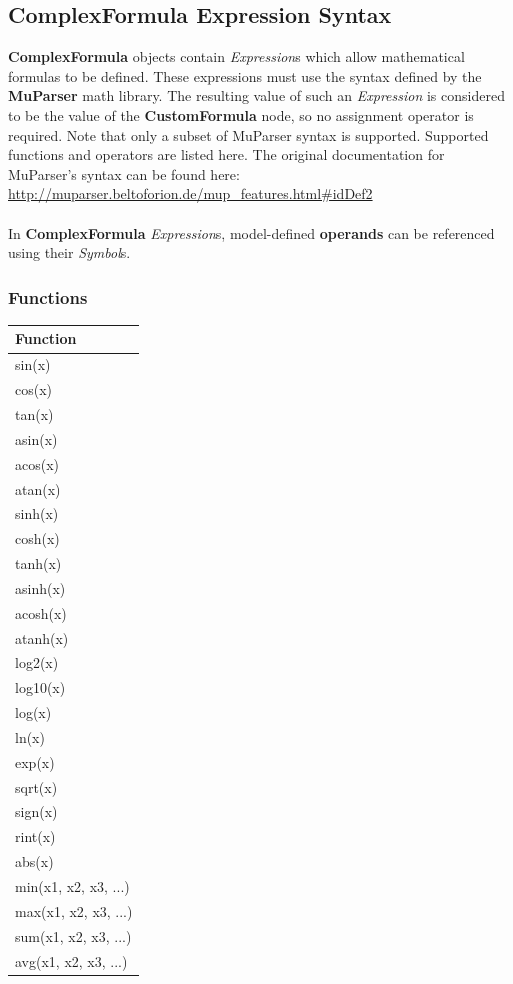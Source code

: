 \subsection{ComplexFormula Expression Syntax}
\label{subsec:ComplexFormulaExpressionSyntax}
\textbf{ComplexFormula} objects contain \textit{Expression}s which allow mathematical formulas to be defined. These expressions must use the syntax defined by the \textbf{MuParser} math library. The resulting value of such an \textit{Expression} is considered to be the value of the \textbf{CustomFormula} node, so no assignment operator is required. Note that only a subset of MuParser syntax is supported. Supported functions and operators are listed here. The original documentation for MuParser's syntax can be found here: \url{http://muparser.beltoforion.de/mup_features.html#idDef2}
\\ \\
In \textbf{ComplexFormula} \textit{Expression}s, model-defined \textbf{operands} can be referenced using their \textit{Symbol}s.

\subsubsection{Functions}
\begin{tabular}{ l }
\textbf{Function} \\ \hline
sin(x) \\ \hline
cos(x) \\ \hline
tan(x) \\ \hline
asin(x) \\ \hline
acos(x) \\ \hline
atan(x) \\ \hline
sinh(x) \\ \hline
cosh(x) \\ \hline
tanh(x) \\ \hline
asinh(x) \\ \hline
acosh(x) \\ \hline
atanh(x) \\ \hline
log2(x) \\ \hline
log10(x) \\ \hline
log(x) \\ \hline
ln(x) \\ \hline
exp(x) \\ \hline
sqrt(x) \\ \hline
sign(x) \\ \hline
rint(x) \\ \hline
abs(x) \\ \hline
min(x1, x2, x3, ...) \\ \hline
max(x1, x2, x3, ...) \\ \hline
sum(x1, x2, x3, ...) \\ \hline
avg(x1, x2, x3, ...) \\ \hline
\end{tabular}

